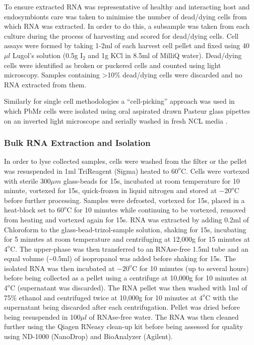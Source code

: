 To ensure extracted RNA was representative of healthy and interacting host 
and endosymbionts care was taken to minimise the number of dead/dying cells 
from which RNA was extracted.  In order to do this, a subsample was taken 
from each culture during the process of harvesting and scored for dead/dying cells.  
Cell assays were formed by taking 1-2ml of each harvest cell pellet and 
fixed using 40$\mu l$ Lugol's solution (0.5g I$_{2}$ and 1g KCl in 8.5ml 
of MilliQ water). Dead/dying cells were identified as broken or puckered cells 
and counted using light microscopy.  Samples containing >10\% dead/dying cells 
were discarded and no RNA extracted from them.

Similarly for single cell methodologies a ``cell-picking'' approach was used in which
PbMr cells were isolated using oral aspirated drawn Pasteur glass pipettes on 
an inverted light microscope and serially washed in fresh NCL media \citep{Garcia-Cuetos2012}.

\subsubsection{Bulk RNA Extraction and Isolation}
In order to lyse collected samples, cells were washed from the filter or the 
pellet was resuspended in 1ml TriReagent (Sigma) heated to $60^{o}$C. 
Cells were vortexed with sterile 300$\mu m$ glass-beads for 15s, incubated at 
room temperature for 10 minute, vortexed for 15s, quick-frozen in liquid 
nitrogen and stored at $-20^{o}$C before further processing.  
Samples were defrosted, vortexed for 15s, placed in a heat-block set 
to $60^{o}$C for 10 minutes while continuing to be vortexed, removed from 
heating and vortexed again for 15s.  
RNA was extracted by adding 0.2ml of Chloroform to the glass-bead-trizol-sample 
solution, shaking for 15s, incubating for 5 minutes at room temperature and 
centrifuging at 12,000g for 15 minutes at $4^{o}$C.  
The upper-phase was then transferred to an RNAse-free 1.5ml tube and an 
equal volume (\textasciitilde$0.5$ml) of isopropanol was added before shaking for 15s.  
The isolated RNA was then incubated at $-20^{o}$C for 10 minutes 
(up to several hours) before being collected as a pellet using a centrifuge at 
10,000g for 10 minutes at $4^{o}$C (supernatant was discarded). 
The RNA pellet was then washed with 1ml of 75\% ethanol and centrifuged 
twice at 10,000g for 10 minutes at $4^{o}$C with the supernatant being 
discarded after each centrifugation.  
Pellet was dried before being resuspended in 100$\mu l$ of RNAse-free water.  
The RNA was then cleaned further using the Qiagen RNeasy clean-up kit 
before being assessed for quality using ND-1000 (NanoDrop) and BioAnalyzer (Agilent).

